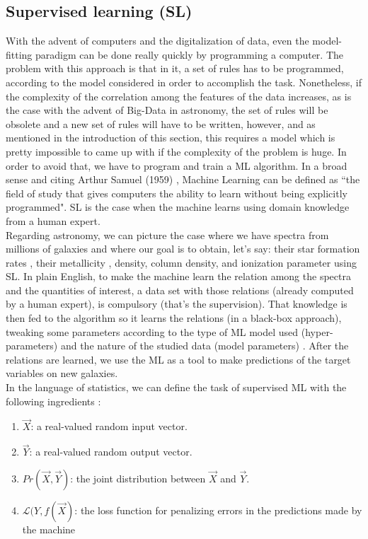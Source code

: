 \subsection{Supervised learning (SL)}

With the advent of computers and the digitalization of data, even the model-fitting paradigm can be done really quickly by programming a computer. The problem with this approach is that in it, a set of rules has to be programmed, according to the model considered in order to accomplish the task. Nonetheless, if the complexity of the correlation among the features of the data increases, as is the case with the advent of Big-Data in astronomy, the set of rules will be obsolete and a new set of rules will have to be written, however, and as mentioned in the introduction of this section, this requires a model which is pretty impossible to came up with if the complexity of the problem is huge. In order to avoid that, we have to program and train a ML algorithm. In a broad sense and citing Arthur Samuel (1959) \cite{Geron2017}, Machine Learning can be defined as ``the field of study that gives computers the ability to learn without being explicitly programmed". SL is the case when the machine learns using domain knowledge from a human expert.\\

Regarding astronomy, we can picture the case where we have spectra from millions of galaxies and where our goal is to obtain, let's say: their star formation rates \cite{DelliVeneri2019}, their metallicity \cite{Acquaviva2016} \cite{Ucci2017}, density, column density, and ionization parameter \cite{Ucci2017} using SL. In plain English, to make the machine learn the relation among the spectra and the quantities of interest, a data set with those relations (already computed by a human expert), is compulsory (that's the supervision). That knowledge is then fed to the algorithm so it learns the relations (in a black-box approach), tweaking some parameters according to the type of ML model used (hyper-parameters) and the nature of the studied data (model parameters) \cite{Baron2019}. After the relations are learned, we use the ML as a tool to make predictions of the target variables on new galaxies.\\

In the language of statistics, we can define the task of supervised ML with the following ingredients \cite{Hastie2003}:
 \begin{enumerate}
     \item $\vec{X}$: a real-valued random input vector.
     \item $\vec{Y}$: a real-valued random output vector.
     \item $Pr(\vec{X},\vec{Y})$: the joint distribution between $\vec{X}$ and $\vec{Y}$.
     \item $\mathcal{L}(Y,f(\vec{X})$: the loss function for penalizing errors in the predictions made by the machine
 \end{enumerate}

